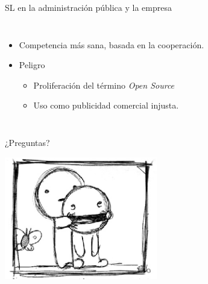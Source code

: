 \documentclass{beamer}
\begin{document}
\begin{frame}{SL en la administración pública y la empresa}
\begin{columns}
    \pause
    
    \begin{itemize}
    \item Competencia más sana, basada en la cooperación.
    \item \alert{Peligro} 
      \begin{itemize}
      \item Proliferación del término \emph{Open Source}
      \item Uso como publicidad comercial injusta.  
      \end{itemize}
    \end{itemize}
  \end{columns}

\end{frame}

\begin{frame}
  \begin{center}
    \huge
    \alert{¿Preguntas?}\\
  \end{center}
  \begin{center}
    \includegraphics[width=0.5\textwidth]{pics/sonrisa.png}
  \end{center}
\end{frame}
\end{document}
